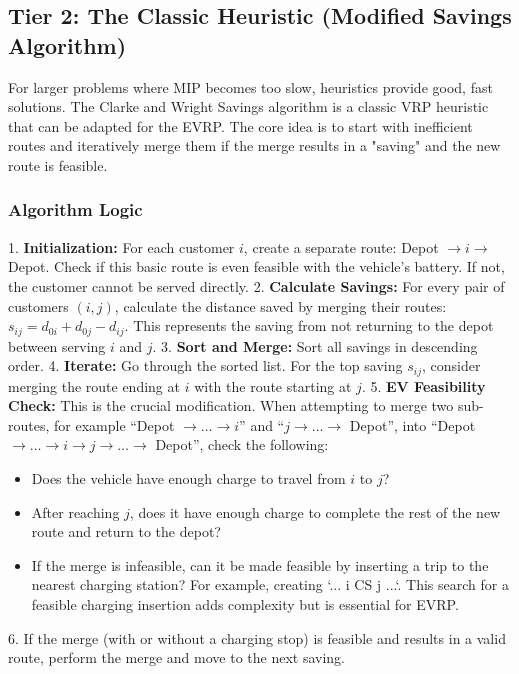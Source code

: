 \documentclass{article}
\begin{document}
\subsection{Tier 2: The Classic Heuristic (Modified Savings Algorithm)}
For larger problems where MIP becomes too slow, heuristics provide good, fast solutions. The Clarke and Wright Savings algorithm is a classic VRP heuristic that can be adapted for the EVRP. The core idea is to start with inefficient routes and iteratively merge them if the merge results in a "saving" and the new route is feasible.

\subsubsection{Algorithm Logic}
1.  \textbf{Initialization:} For each customer $i$, create a separate route: Depot $\to i \to$ Depot. Check if this basic route is even feasible with the vehicle's battery. If not, the customer cannot be served directly.
2.  \textbf{Calculate Savings:} For every pair of customers $(i, j)$, calculate the distance saved by merging their routes: $s_{ij} = d_{0i} + d_{0j} - d_{ij}$. This represents the saving from not returning to the depot between serving $i$ and $j$.
3.  \textbf{Sort and Merge:} Sort all savings in descending order.
4.  \textbf{Iterate:} Go through the sorted list. For the top saving $s_{ij}$, consider merging the route ending at $i$ with the route starting at $j$.
5.  \textbf{EV Feasibility Check:} This is the crucial modification. When attempting to merge two sub-routes, for example ``Depot $\to \dots \to i$'' and ``$j \to \dots \to$ Depot'', into ``Depot $\to \dots \to i \to j \to \dots \to$ Depot'', check the following:
    \begin{itemize}
        \item Does the vehicle have enough charge to travel from $i$ to $j$?
        \item After reaching $j$, does it have enough charge to complete the rest of the new route and return to the depot?
        \item If the merge is infeasible, can it be made feasible by inserting a trip to the nearest charging station? For example, creating `... \to i \to CS \to j \to ...`. This search for a feasible charging insertion adds complexity but is essential for EVRP.
    \end{itemize}
6.  If the merge (with or without a charging stop) is feasible and results in a valid route, perform the merge and move to the next saving.
\end{document}

